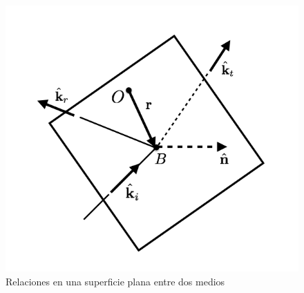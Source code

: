 \documentclass[11pt,fleqn]{book} %
\begin{document}
\begin{figure}[hbtp]
\centering
\includegraphics[scale=0.4]{Pictures/Relsuperficie.png}
\caption{Relaciones en una superficie plana entre dos medios}
\end{figure}
\end{document}
